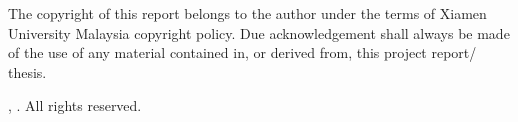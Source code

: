 \xmumfrontmatterpagenotoc{}

The copyright of this report belongs to the author under the terms of Xiamen
University Malaysia copyright policy. Due acknowledgement shall always be made
of the use of any material contained in, or derived from, this project report/
thesis.

\vspace{2\baselineskip}

\hspace*{1.27cm}\textcopyright{}\xmumSubmissionYear, \xmumStudentName. All rights reserved.


